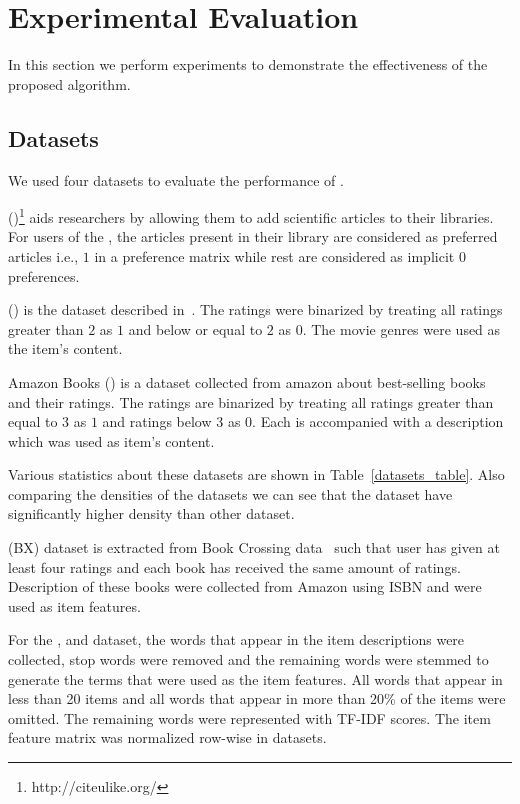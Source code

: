
\section{Experimental Evaluation} \label{ch:bilinear:experiments}

In this section we perform experiments to 
demonstrate the effectiveness of the proposed algorithm. 

\subsection{Datasets}
We used four datasets to evaluate the performance of \CF.

\CULEXP (\CUL)\footnote{http://citeulike.org/} aids researchers by allowing
them to add scientific articles to their libraries. For users of the \CUL, the
articles present in their library are considered as preferred articles i.e., $1$
in a preference matrix while rest are considered as implicit $0$ preferences. 

\MLHREXP (\MLHR) is the dataset described in~\cite{cantador11}. The ratings were
binarized by treating all ratings greater than $2$ as $1$ and below or equal 
to $2$ as $0$. The movie genres were used as the item's content. 
 
Amazon Books (\AMAZON) is a dataset collected from amazon about best-selling books
and their ratings. The ratings are binarized by treating all ratings greater
than equal to $3$ as $1$ and ratings below $3$ as $0$. Each is accompanied with a
description which was used as item's content.

Various statistics about these datasets are shown in Table~\ref{datasets_table}.
Also comparing the densities of the datasets we can see that the \MLHREXP dataset 
have significantly higher density than other dataset.

\BX (BX) dataset is extracted from Book Crossing
data~\cite{ziegler05www} such
that user has given at least four ratings and each book has received the same
amount of ratings. Description of these books were collected from Amazon using
ISBN and were used as item features.

For the \AMAZON, \CUL and \BX dataset, the words that appear in the item descriptions were
collected, stop words were removed and the remaining words were stemmed to
generate the terms that were used as the item features. All words that appear in
less than 20 items and all words that appear in more than 20\% of the items were
omitted. The remaining words were represented with TF-IDF scores. The item
feature matrix was normalized row-wise in datasets. 


